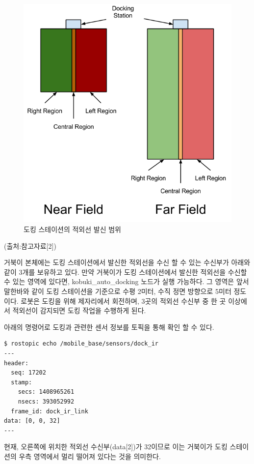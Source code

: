 \begin{figure}[h]
\centering\includegraphics[width=0.8\columnwidth]{pictures/chapter10/docking_region.png}
\caption{도킹 스테이션의 적외선 발신 범위}
\end{figure}

(출처:참고자료[2])


거북이 본체에는 도킹 스테이션에서 발신한 적외선을 수신 할 수 있는 수신부가 아래와 같이 3개를 보유하고 있다. 만약 거북이가 도킹 스테이션에서 발신한 적외선을 수신할 수 있는 영역에 있다면, kobuki\_auto\_docking 노드가 실행 가능하다. 그 영역은 앞서 말한바와 같이 도킹 스테이션을 기준으로 수평 2미터, 수직 정면 방향으로 5미터 정도이다. 로봇은 도킹을 위해 제자리에서 회전하며, 3곳의 적외선 수신부 중 한 곳 이상에서 적외선이 감지되면 도킹 작업을 수행하게 된다. 

아래의 명령어로 도킹과 관련한 센서 정보를 토픽을 통해 확인 할 수 있다.

\vspace{\baselineskip}
\begin{lstlisting}[language=ROS]
$ rostopic echo /mobile_base/sensors/dock_ir
---
header: 
  seq: 17202
  stamp: 
    secs: 1408965261
    nsecs: 393052992
  frame_id: dock_ir_link
data: [0, 0, 32]
---
\end{lstlisting}


현재, 오른쪽에 위치한 적외선 수신부(data[2])가 32이므로 이는 거북이가 도킹 스테이션의 우측 영역에서 멀리 떨어져 있다는 것을 의미한다.

